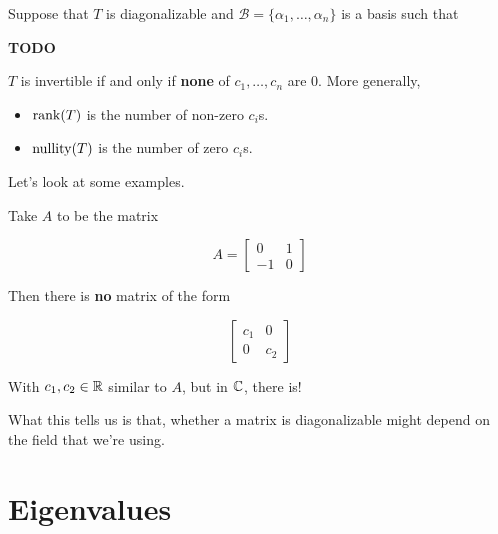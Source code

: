 \documentclass[12pt]{article}
\def\B{\mathcal B}
\newcommand{\TODO}{\color{red}\textbf{TODO}\color{black}}
\begin{document}
  Suppose that $T$ is diagonalizable and $\B =\{\alpha_1, \dots, \alpha_n\}$ is
  a basis such that

  \TODO{}

  $T$ is invertible if and only if {\bf none} of $c_1, \dots, c_n$ are 0. More
  generally,

  \begin{itemize}
    \item $\mathrm{rank}(T)$ is the number of non-zero $c_i$s.
    \item $\mathrm{nullity}(T)$ is the number of zero $c_i$s.
  \end{itemize}

  Let's look at some examples.


  Take $A$ to be the matrix

  \[
    A = \begin{bmatrix}
      0 & 1 \\
      -1 & 0
    \end{bmatrix}
  \]

  Then there is {\bf no} matrix of the form

  \[
    \begin{bmatrix}
      c_1 & 0 \\
      0 & c_2
    \end{bmatrix}
  \]

  With $c_1, c_2 \in {\mathbb R}$ similar to $A$, but in ${\mathbb C}$, there is!

  What this tells us is that, whether a matrix is diagonalizable might depend on
  the field that we're using.

  \section{Eigenvalues}
\end{document}
